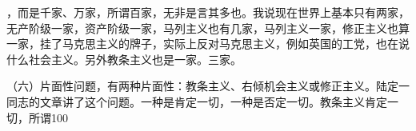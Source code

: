 ，而是千家、万家，所谓百家，无非是言其多也。我说现在世界上基本只有两家，无产阶级一家，资产阶级一家，马列主义也有几家，马列主义一家，修正主义也算一家，挂了马克思主义的牌子，实际上反对马克思主义，例如英国的工党，也在说什么社会主义。另外教条主义也是一家。三家。

（六）片面性问题，有两种片面性：教条主义、右倾机会主义或修正主义。陆定一同志的文章讲了这个问题。一种是肯定一切，一种是否定一切。教条主义肯定一切，所谓100%

